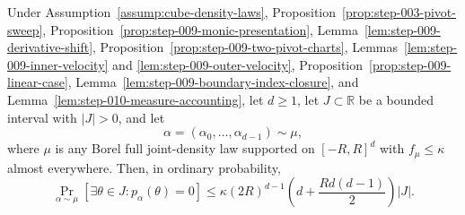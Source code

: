 \begin{proposition}
\label{prop:step-010-positive-length}
Under Assumption~\ref{assump:cube-density-laws}, Proposition~\ref{prop:step-003-pivot-sweep}, Proposition~\ref{prop:step-009-monic-presentation}, Lemma~\ref{lem:step-009-derivative-shift}, Proposition~\ref{prop:step-009-two-pivot-charts}, Lemmas~\ref{lem:step-009-inner-velocity} and \ref{lem:step-009-outer-velocity}, Proposition~\ref{prop:step-009-linear-case}, Lemma~\ref{lem:step-009-boundary-index-closure}, and Lemma~\ref{lem:step-010-measure-accounting}, let \(d\geq1\), let \(J\subset\mathbb R\) be a bounded interval with \(\lvert J\rvert>0\), and let
\begin{equation}
\label{eq:appendix-display-321}
\alpha=(\alpha_0,\ldots,\alpha_{d-1})\sim\mu,
\end{equation}
where \(\mu\) is any Borel full joint-density law supported on \([-R,R]^d\) with \(f_\mu\leq\kappa\) almost everywhere. Then, in ordinary probability,
\begin{equation}
\label{eq:appendix-display-322}
\Pr_{\alpha\sim\mu}[\exists\theta\in J:p_\alpha(\theta)=0]
\leq
\kappa(2R)^{d-1}
\left(d+\frac{Rd(d-1)}2\right)\lvert J\rvert.
\end{equation}


\end{proposition}

